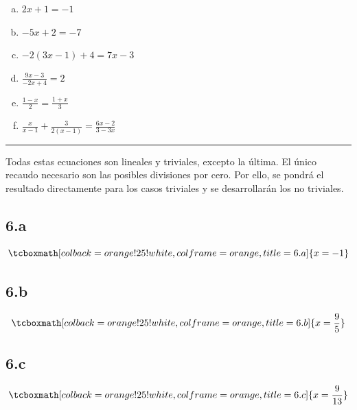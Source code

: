 \documentclass{article}
\newcommand{\hresult}[2]{\tcboxmath[colback=orange!25!white,colframe=orange, title=#1] {#2} }
\begin{document}
\begin{enumerate}[(a)]
\bfseries

\item $ 2x + 1 = -1 $

\item $ -5x + 2 = -7 $

\item $ -2(3x-1) + 4 = 7x -3 $

\item $ \frac{9x - 3}{-2x + 4} = 2 $

\item $ \frac{1-x}{2} = \frac{1 + x}{3} $

\item $ \frac{x}{x-1} + \frac{3}{2(x-1)} = \frac{6x-2}{3-3x} $

\end{enumerate}
\hrule
\vspace{1em}
Todas estas ecuaciones son lineales y triviales, excepto la última. El único recaudo necesario son las posibles divisiones por cero. Por ello, se pondrá el resultado directamente para los casos triviales y se desarrollarán los no triviales.

\subsection*{6.a}
\label{subsec:6.a}

\begin{equation}
\hresult{6.a} { x = -1 }
\end{equation}

\subsection*{6.b}
\label{subsec:6.b}

\begin{equation}
\hresult{6.b} { x = \frac{9}{5} }
\end{equation}

\subsection*{6.c}
\label{subsec:6.c}

\begin{equation}
\hresult{6.c} { x = \frac{9}{13} }
\end{equation}
\end{document}
